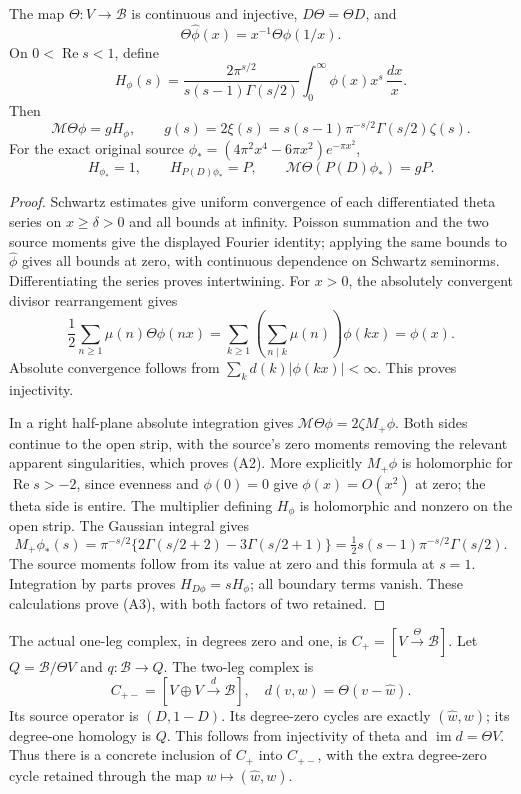 \documentclass[11pt,a4paper]{article}
\begin{document}
\begin{proposition}
The map \(\Theta:V\to\mathscr B\) is continuous and injective,
\(D\Theta=\Theta D\), and
\[
 \Theta\widehat\phi(x)=x^{-1}\Theta\phi(1/x).
\]
On \(0<\operatorname{Re}s<1\), define
\[
 H_\phi(s)=\frac{2\pi^{s/2}}
             {s(s-1)\Gamma(s/2)}\int_0^\infty\phi(x)x^s\,\frac{dx}{x}.
\]
Then
\[
 \mathcal M\Theta\phi=gH_\phi,\qquad
 g(s)=2\xi(s)=s(s-1)\pi^{-s/2}\Gamma(s/2)\zeta(s).
 \tag{A2}
\]
For the exact original source
\(\phi_*=(4\pi^2x^4-6\pi x^2)e^{-\pi x^2}\),
\[
 H_{\phi_*}=1,\qquad
 H_{P(D)\phi_*}=P,\qquad
 \mathcal M\Theta(P(D)\phi_*)=gP .
 \tag{A3}
\]
\end{proposition}
\begin{proof}
Schwartz estimates give uniform convergence of each differentiated
theta series on \(x\geq\delta>0\) and all bounds at infinity.
Poisson summation and the two source moments give the displayed
Fourier identity; applying the same bounds to \(\widehat\phi\)
gives all bounds at zero, with continuous dependence on Schwartz
seminorms. Differentiating the series proves intertwining.
For \(x>0\), the absolutely convergent divisor rearrangement gives
\[
 \frac12\sum_{n\geq1}\mu(n)\Theta\phi(nx)
   =\sum_{k\geq1}\left(\sum_{n\mid k}\mu(n)\right)\phi(kx)=\phi(x).
\]
Absolute convergence follows from
\(\sum_k d(k)|\phi(kx)|<\infty\).
This proves injectivity.

In a right half-plane absolute integration gives
\(\mathcal M\Theta\phi=2\zeta M_+\phi\).
Both sides continue to the open strip, with the source's zero
moments removing the relevant apparent singularities, which
proves (A2). More explicitly \(M_+\phi\) is holomorphic for
\(\operatorname{Re}s>-2\), since evenness and \(\phi(0)=0\)
give \(\phi(x)=O(x^2)\) at zero; the theta side is entire.
The multiplier defining \(H_\phi\) is holomorphic and nonzero
on the open strip. The Gaussian integral gives
\[
 M_+\phi_*(s)
 =\pi^{-s/2}\{2\Gamma(s/2+2)-3\Gamma(s/2+1)\}
 =\tfrac12s(s-1)\pi^{-s/2}\Gamma(s/2).
\]
The source moments follow from its value at zero and this formula
at \(s=1\). Integration by parts proves
\(H_{D\phi}=sH_\phi\); all boundary terms vanish.
These calculations prove (A3), with both factors of two retained.
\end{proof}

The actual one-leg complex, in degrees zero and one, is
\(C_+=[V\xrightarrow{\Theta}\mathscr B]\).
Let \(Q=\mathscr B/\Theta V\) and \(q:\mathscr B\to Q\).
The two-leg complex is
\[
 C_{+-}=[V\oplus V\xrightarrow{d}\mathscr B],\quad
       d(v,w)=\Theta(v-\widehat w).
 \tag{A4}
\]
Its source operator is \((D,1-D)\).
Its degree-zero cycles are exactly \((\widehat w,w)\);
its degree-one homology is \(Q\). This follows from injectivity
of theta and \(\operatorname{im}d=\Theta V\).
Thus there is a concrete inclusion of \(C_+\) into \(C_{+-}\),
with the extra degree-zero cycle retained through the map
\(w\mapsto(\widehat w,w)\).
\end{document}
